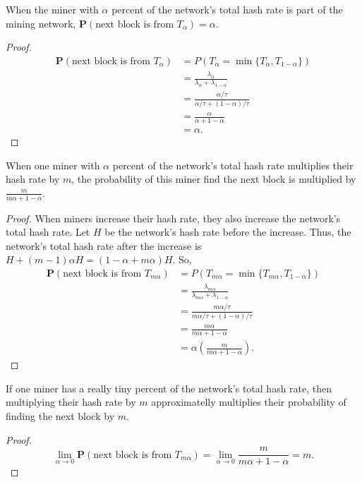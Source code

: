 \begin{theorem}
	When the miner with $\alpha$ percent of the network's total hash rate is part of the mining network, $\mathbf{P}(\text{next block is from $T_\alpha$}) = \alpha.$
\end{theorem}
\begin{proof}
\begin{align*}
	\mathbf{P}(\text{next block is from $T_\alpha$}) &= P \left( T_\alpha = \min\{T_\alpha, T_{1-\alpha}\} \right) \\
		&= \frac{\lambda_\alpha}{\lambda_\alpha + \lambda_{1-\alpha}} \\
		&= \frac{\alpha/\tau}{\alpha/\tau + (1-\alpha)/\tau} \\
		&= \frac{\alpha}{\alpha + 1 - \alpha} \\
		&= \alpha.
\end{align*}
\end{proof}

\begin{theorem}
	When one miner with $\alpha$ percent of the network's total hash rate multiplies their hash rate by $m$, the probability of this miner find the next block is multiplied by $\frac{m}{m \alpha + 1 - \alpha}$.
	\label{thm-miner-multiply}
\end{theorem}
\begin{proof}
	When miners increase their hash rate, they also increase the network's total hash rate. Let $H$ be the network's hash rate before the increase. Thus, the network's total hash rate after the increase is $H + (m-1) \alpha H = (1 - \alpha + m \alpha) H$. So,
\begin{align*}
	\mathbf{P}(\text{next block is from $T_{m \alpha}$}) &= P \left( T_{m \alpha} = \min\{T_{m \alpha}, T_{1-\alpha}\} \right) \\
		&= \frac{\lambda_{m \alpha}}{\lambda_{m \alpha} + \lambda_{1-\alpha}} \\
		&= \frac{m \alpha/\tau}{m \alpha/\tau + (1-\alpha)/\tau} \\
		&= \frac{m \alpha}{m \alpha + 1-\alpha} \\
		&= \alpha \left( \frac{m}{m \alpha + 1 - \alpha} \right).
\end{align*}
\end{proof}

\begin{cor}
	If one miner has a really tiny percent of the network's total hash rate, then multiplying their hash rate by $m$ approximatelly multiplies their probability of finding the next block by $m$.
\end{cor}
\begin{proof}
	$$\lim_{\alpha \rightarrow 0} \mathbf{P}(\text{next block is from $T_{m \alpha}$}) = \lim_{\alpha \rightarrow 0} \frac{m}{m \alpha + 1 - \alpha} = m.$$
\end{proof}

